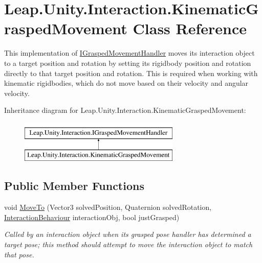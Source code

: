 \hypertarget{class_leap_1_1_unity_1_1_interaction_1_1_kinematic_grasped_movement}{}\section{Leap.\+Unity.\+Interaction.\+Kinematic\+Grasped\+Movement Class Reference}
\label{class_leap_1_1_unity_1_1_interaction_1_1_kinematic_grasped_movement}


This implementation of \mbox{\hyperlink{interface_leap_1_1_unity_1_1_interaction_1_1_i_grasped_movement_handler}{I\+Grasped\+Movement\+Handler}} moves its interaction object to a target position and rotation by setting its rigidbody position and rotation directly to that target position and rotation. This is required when working with kinematic rigidbodies, which do not move based on their velocity and angular velocity.  


Inheritance diagram for Leap.\+Unity.\+Interaction.\+Kinematic\+Grasped\+Movement\+:\begin{figure}[H]
\begin{center}
\leavevmode
\includegraphics[height=2.000000cm]{class_leap_1_1_unity_1_1_interaction_1_1_kinematic_grasped_movement}
\end{center}
\end{figure}
\subsection*{Public Member Functions}
\begin{DoxyCompactItemize}
\item 
void \mbox{\hyperlink{class_leap_1_1_unity_1_1_interaction_1_1_kinematic_grasped_movement_adfd0036833934df0d569feb112c7345e}{Move\+To}} (Vector3 solved\+Position, Quaternion solved\+Rotation, \mbox{\hyperlink{class_leap_1_1_unity_1_1_interaction_1_1_interaction_behaviour}{Interaction\+Behaviour}} interaction\+Obj, bool just\+Grasped)
\begin{DoxyCompactList}\small\item\em Called by an interaction object when its grasped pose handler has determined a target pose; this method should attempt to move the interaction object to match that pose. \end{DoxyCompactList}\end{DoxyCompactItemize}


